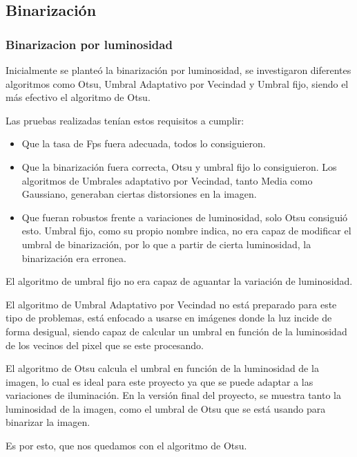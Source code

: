 \subsection{Binarización}
\subsubsection{Binarizacion por luminosidad}
Inicialmente se planteó la binarización por luminosidad, se investigaron diferentes algoritmos como Otsu, Umbral Adaptativo por Vecindad y Umbral fijo, siendo el más efectivo el algoritmo de Otsu. 

Las pruebas realizadas tenían estos requisitos a cumplir:

\begin{itemize}

	\item Que la tasa de Fps fuera adecuada, todos lo consiguieron.
	
	\item Que la binarización fuera correcta, Otsu y umbral fijo lo consiguieron. Los algoritmos de Umbrales adaptativo por Vecindad, tanto Media como Gaussiano, generaban ciertas distorsiones en la imagen.
	
	\item Que fueran robustos frente a variaciones de luminosidad, solo Otsu consiguió esto. Umbral fijo, como su propio nombre indica, no era capaz de modificar el umbral de binarización, por lo que a partir de cierta luminosidad, la binarización era erronea.
\end{itemize}

El algoritmo de umbral fijo no era capaz de aguantar la variación de luminosidad. 

El algoritmo de Umbral Adaptativo por Vecindad no está preparado para este tipo de problemas, está enfocado a usarse en imágenes donde la luz incide de forma desigual, siendo capaz de calcular un umbral en función de la luminosidad de los vecinos del pixel que se este procesando.

El algoritmo de Otsu calcula el umbral en función de la luminosidad de la imagen, lo cual es ideal para este proyecto ya que se puede adaptar a las variaciones de iluminación. En la versión final del proyecto, se muestra tanto la luminosidad de la imagen, como el umbral de Otsu que se está usando para binarizar la imagen.

Es por esto, que nos quedamos con el algoritmo de Otsu.


